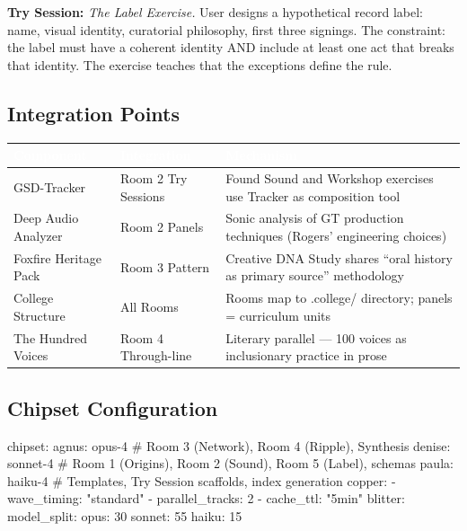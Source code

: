 \documentclass[11pt,letterpaper]{article}
\newcommand{\tableheader}[1]{\textbf{\sffamily\textcolor{white}{#1}}}
\begin{document}
\textbf{Try Session:} \textit{The Label Exercise.} User designs a hypothetical record label: name, visual identity, curatorial philosophy, first three signings. The constraint: the label must have a coherent identity AND include at least one act that breaks that identity. The exercise teaches that the exceptions define the rule.

\subsection{Integration Points}

\begin{center}
\begin{tabularx}{\textwidth}{L{3.5cm}L{3cm}X}
\toprule
{}
\tableheader{Component} & \tableheader{Integration} & \tableheader{Mechanism} \\
\midrule
GSD-Tracker & Room 2 Try Sessions & Found Sound and Workshop exercises use Tracker as composition tool \\
Deep Audio Analyzer & Room 2 Panels & Sonic analysis of GT production techniques (Rogers' engineering choices) \\
Foxfire Heritage Pack & Room 3 Pattern & Creative DNA Study shares ``oral history as primary source'' methodology \\
College Structure & All Rooms & Rooms map to .college/ directory; panels = curriculum units \\
The Hundred Voices & Room 4 Through-line & Literary parallel --- 100 voices as inclusionary practice in prose \\
\bottomrule
\end{tabularx}
\end{center}

\subsection{Chipset Configuration}

\begin{asciibox}
chipset:
  agnus: opus-4     # Room 3 (Network), Room 4 (Ripple), Synthesis
  denise: sonnet-4   # Room 1 (Origins), Room 2 (Sound), Room 5 (Label), schemas
  paula: haiku-4     # Templates, Try Session scaffolds, index generation
  copper:
    - wave_timing: "standard"
    - parallel_tracks: 2
    - cache_ttl: "5min"
  blitter:
    model_split:
      opus: 30%
      sonnet: 55%
      haiku: 15%
\end{asciibox}
\end{document}
